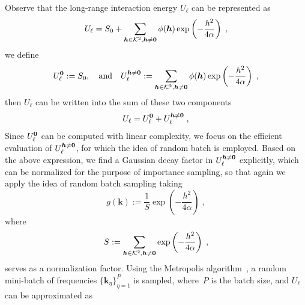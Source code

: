 Observe that the long-range interaction energy $U_\ell$ can be represented as
\[
U_\ell =   S_0+ \sum_{\boldsymbol{h}\in\mathcal{K}^2,\boldsymbol{h}\neq\bm{0}}\phi(\boldsymbol{h}) \exp\left(-\frac{h^2}{4\alpha}\right) \;,
\]
we define 
\begin{equation}\label{eq::U_l0_Ulk}
    U_\ell^{\bm{0}} := S_0,\quad\text{and}\quad U_\ell^{\boldsymbol{h}\neq \bm{0}} :=\sum_{\boldsymbol{h}\in\mathcal{K}^2,\boldsymbol{h}\neq\bm{0}}\phi(\boldsymbol{h}) \exp\left(-\frac{h^2}{4\alpha}\right) \;,
\end{equation}
then $U_\ell$ can be written into the sum of these two components
\[
U_\ell= U_\ell^{\bm{0}}+U_\ell^{\boldsymbol{h}\neq \bm{0}}\;,
\]
Since 
$ U_\ell^{\bm{0}}$
can be computed with linear complexity, we focus on the efficient evaluation of 
$U_\ell^{\boldsymbol{h}\neq \bm{0}}$, for which the idea of random batch is employed.
Based on the above expression, we find a Gaussian decay factor in $U_\ell^{\boldsymbol{h}\neq \bm{0}}$ explicitly, which can be normalized for the  purpose of importance sampling, so that again we apply the idea of random batch sampling taking
\begin{equation}\label{eq::hk}
	g(\bm{k}) := \frac{1}{S} \exp\left(-\frac{h^2}{4\alpha}\right)\;, %
\end{equation}
where \[S:= \sum_{\boldsymbol{h}\in\mathcal{K}^2,\boldsymbol{h}\neq\bm{0}}\exp\left(-\frac{h^2}{4\alpha}\right)\;,\] serves as a normalization factor.
%
%
%
%
Using the Metropolis algorithm~\cite{metropolis1953equation}, a random mini-batch of frequencies $\{\bm{k}_{\eta}\}_{\eta=1}^P$ is sampled, where~$P$ is the batch size, and $U_\ell$ can be approximated as 
